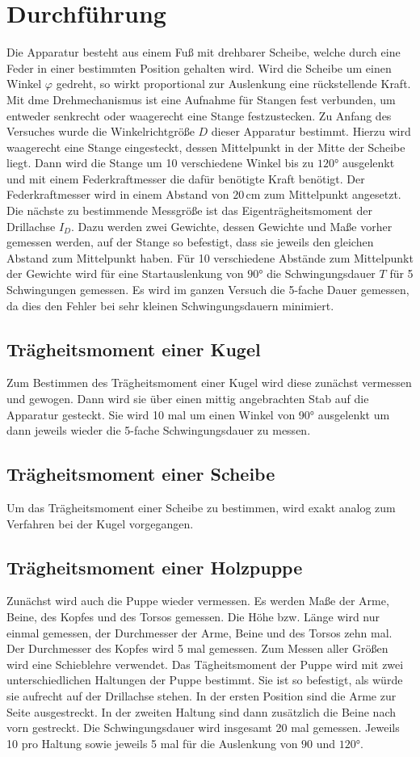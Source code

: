 \section{Durchführung}
\label{sec:Durchführung}
Die Apparatur besteht aus einem Fuß mit drehbarer Scheibe, welche durch eine Feder in einer bestimmten 
Position gehalten wird. Wird die Scheibe um einen Winkel $\varphi$ gedreht, so wirkt proportional zur Auslenkung 
eine rückstellende Kraft. Mit dme Drehmechanismus ist eine Aufnahme für Stangen fest verbunden, um entweder 
senkrecht oder waagerecht eine Stange festzustecken.  
Zu Anfang des Versuches wurde die Winkelrichtgröße $D$ dieser Apparatur bestimmt. Hierzu wird waagerecht eine Stange 
eingesteckt, dessen Mittelpunkt in der Mitte der Scheibe liegt. Dann wird die Stange um 10 verschiedene Winkel bis zu 
$120°$ ausgelenkt und mit einem Federkraftmesser die dafür benötigte Kraft benötigt. Der Federkraftmesser wird 
in einem Abstand von $20$\,cm zum Mittelpunkt angesetzt. Die nächste zu bestimmende Messgröße ist das 
Eigenträgheitsmoment der Drillachse $I_D$. Dazu werden zwei Gewichte, dessen Gewichte und Maße vorher gemessen werden,
auf der Stange so befestigt, dass sie jeweils den gleichen Abstand zum Mittelpunkt haben.
Für 10 verschiedene Abstände zum Mittelpunkt der Gewichte wird für eine Startauslenkung 
von $90°$ die Schwingungsdauer $T$ für 5 Schwingungen gemessen. Es wird im ganzen Versuch die 5-fache Dauer gemessen, 
da dies den Fehler bei sehr kleinen Schwingungsdauern minimiert.
\subsection{Trägheitsmoment einer Kugel}
Zum Bestimmen des Trägheitsmoment einer Kugel wird diese zunächst vermessen und gewogen. Dann wird sie über einen mittig
angebrachten Stab auf die Apparatur gesteckt. Sie wird 10 mal um einen Winkel von 90° ausgelenkt um dann jeweils wieder 
die 5-fache Schwingungsdauer zu messen. 
\subsection{Trägheitsmoment einer Scheibe}
Um das Trägheitsmoment einer Scheibe zu bestimmen, wird exakt analog zum Verfahren bei der Kugel vorgegangen.
\subsection{Trägheitsmoment einer Holzpuppe}
Zunächst wird auch die Puppe wieder vermessen. Es werden Maße der Arme, Beine, des Kopfes und des Torsos gemessen. Die 
Höhe bzw. Länge wird nur einmal gemessen, der Durchmesser der Arme, Beine und des Torsos zehn mal. Der Durchmesser des 
Kopfes wird 5 mal gemessen. Zum Messen aller Größen wird eine Schieblehre verwendet. Das Tägheitsmoment der Puppe wird 
mit zwei unterschiedlichen Haltungen der Puppe bestimmt. Sie ist so befestigt, als würde sie aufrecht auf der Drillachse 
stehen. In der ersten Position sind die Arme zur Seite ausgestreckt. In der zweiten Haltung sind dann zusätzlich die 
Beine nach vorn gestreckt. Die Schwingungsdauer wird insgesamt 20 mal gemessen. Jeweils 10 pro Haltung sowie jeweils 
5 mal für die Auslenkung von $90$ und $120°$.